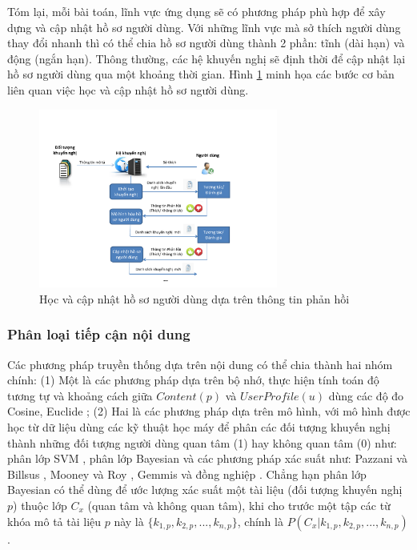 Tóm lại, mỗi bài toán, lĩnh vực ứng dụng sẽ có phương pháp phù hợp để xây dựng và cập nhật hồ sơ người dùng. Với những lĩnh vực mà sở thích người dùng thay đổi nhanh thì có thể chia hồ sơ người dùng thành 2 phần: tĩnh (dài hạn) và động (ngắn hạn). Thông thường, các hệ khuyến nghị sẽ định thời để cập nhật lại hồ sơ người dùng qua một khoảng thời gian. Hình \ref{fig:figure_1_12} minh họa các bước cơ bản liên quan việc học và cập nhật hồ sơ người dùng.
\begin{figure}[ht]
	\begin{center}
		\includegraphics[width=0.70\textwidth]{Figure_1_12.pdf}
		\caption{Học và cập nhật hồ sơ người dùng dựa trên thông tin phản hồi}\label{fig:figure_1_12}
	\end{center}
\end{figure}
\subsubsection{Phân loại tiếp cận nội dung}
Các phương pháp truyền thống dựa trên nội dung có thể chia thành hai nhóm chính: (1) Một là các phương pháp dựa trên bộ nhớ, thực hiện tính toán độ tương tự và khoảng cách giữa $Content(p)$ và $UserProfile(u)$ dùng các độ đo Cosine, Euclide \cite{Baeza-Yates:1999:MIR}; (2) Hai là các phương pháp dựa trên mô hình, với mô hình được học từ dữ liệu dùng các kỹ thuật học máy để phân các đối tượng khuyến nghị thành những đối tượng người dùng quan tâm (1) hay không quan tâm (0) như: phân lớp SVM \cite{Joachims:1998:TCS}, phân lớp Bayesian \cite{Nigam:2000:TCL} và các phương pháp xác suất như: Pazzani và Billsus \cite{Pazzani:1997}, Mooney và Roy \cite{Mooney:2000:CBR}, Gemmis và đồng nghiệp \cite{deGemmis:2008:ITS}. Chẳng hạn phân lớp Bayesian có thể dùng để ước lượng xác suất một tài liệu (đối tượng khuyến nghị $p$) thuộc lớp $C_{x}$ (quan tâm và không quan tâm), khi cho trước một tập các từ khóa mô tả tài liệu $p$ này là $\{k_{1,p}, k_{2,p}, ..., k_{n,p}\}$, chính là $P(C_{x}|k_{1,p}, k_{2,p}, ..., k_{n,p})$ \cite{Nigam:2000:TCL}.

